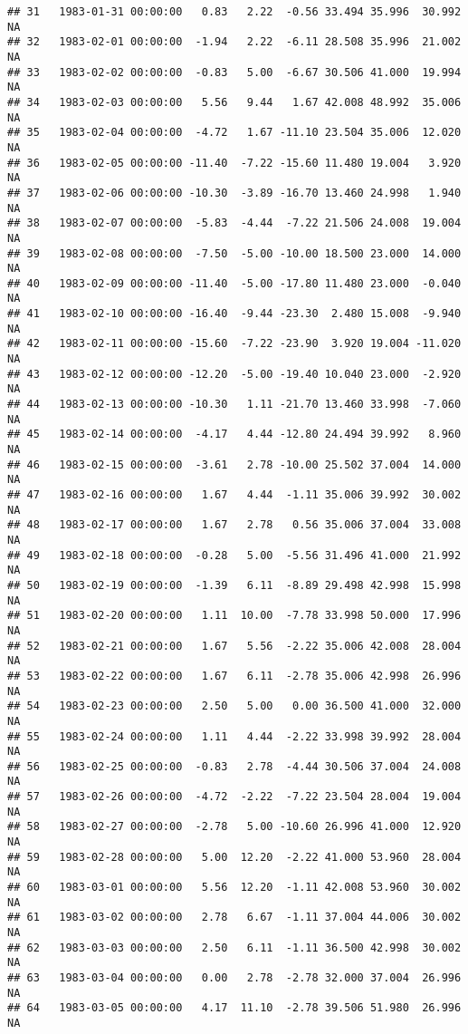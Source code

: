 \documentclass{article}\usepackage{graphicx, color}
\makeatletter
\newenvironment{kframe}{%
 \def\at@end@of@kframe{}%
 \ifinner\ifhmode%
  \def\at@end@of@kframe{\end{minipage}}%
  \begin{minipage}{\columnwidth}%
 \fi\fi%
 \def\FrameCommand##1{\hskip\@totalleftmargin \hskip-\fboxsep
 \colorbox{shadecolor}{##1}\hskip-\fboxsep
     \hskip-\linewidth \hskip-\@totalleftmargin \hskip\columnwidth}%
 \MakeFramed {\advance\hsize-\width
   \@totalleftmargin\z@ \linewidth\hsize
   \@setminipage}}%
 {\par\unskip\endMakeFramed%
 \at@end@of@kframe}
\newenvironment{knitrout}{}{} %
\makeatother
\begin{document}
\begin{knitrout}
\begin{kframe}
\begin{verbatim}
## 31   1983-01-31 00:00:00   0.83   2.22  -0.56 33.494 35.996  30.992     NA
## 32   1983-02-01 00:00:00  -1.94   2.22  -6.11 28.508 35.996  21.002     NA
## 33   1983-02-02 00:00:00  -0.83   5.00  -6.67 30.506 41.000  19.994     NA
## 34   1983-02-03 00:00:00   5.56   9.44   1.67 42.008 48.992  35.006     NA
## 35   1983-02-04 00:00:00  -4.72   1.67 -11.10 23.504 35.006  12.020     NA
## 36   1983-02-05 00:00:00 -11.40  -7.22 -15.60 11.480 19.004   3.920     NA
## 37   1983-02-06 00:00:00 -10.30  -3.89 -16.70 13.460 24.998   1.940     NA
## 38   1983-02-07 00:00:00  -5.83  -4.44  -7.22 21.506 24.008  19.004     NA
## 39   1983-02-08 00:00:00  -7.50  -5.00 -10.00 18.500 23.000  14.000     NA
## 40   1983-02-09 00:00:00 -11.40  -5.00 -17.80 11.480 23.000  -0.040     NA
## 41   1983-02-10 00:00:00 -16.40  -9.44 -23.30  2.480 15.008  -9.940     NA
## 42   1983-02-11 00:00:00 -15.60  -7.22 -23.90  3.920 19.004 -11.020     NA
## 43   1983-02-12 00:00:00 -12.20  -5.00 -19.40 10.040 23.000  -2.920     NA
## 44   1983-02-13 00:00:00 -10.30   1.11 -21.70 13.460 33.998  -7.060     NA
## 45   1983-02-14 00:00:00  -4.17   4.44 -12.80 24.494 39.992   8.960     NA
## 46   1983-02-15 00:00:00  -3.61   2.78 -10.00 25.502 37.004  14.000     NA
## 47   1983-02-16 00:00:00   1.67   4.44  -1.11 35.006 39.992  30.002     NA
## 48   1983-02-17 00:00:00   1.67   2.78   0.56 35.006 37.004  33.008     NA
## 49   1983-02-18 00:00:00  -0.28   5.00  -5.56 31.496 41.000  21.992     NA
## 50   1983-02-19 00:00:00  -1.39   6.11  -8.89 29.498 42.998  15.998     NA
## 51   1983-02-20 00:00:00   1.11  10.00  -7.78 33.998 50.000  17.996     NA
## 52   1983-02-21 00:00:00   1.67   5.56  -2.22 35.006 42.008  28.004     NA
## 53   1983-02-22 00:00:00   1.67   6.11  -2.78 35.006 42.998  26.996     NA
## 54   1983-02-23 00:00:00   2.50   5.00   0.00 36.500 41.000  32.000     NA
## 55   1983-02-24 00:00:00   1.11   4.44  -2.22 33.998 39.992  28.004     NA
## 56   1983-02-25 00:00:00  -0.83   2.78  -4.44 30.506 37.004  24.008     NA
## 57   1983-02-26 00:00:00  -4.72  -2.22  -7.22 23.504 28.004  19.004     NA
## 58   1983-02-27 00:00:00  -2.78   5.00 -10.60 26.996 41.000  12.920     NA
## 59   1983-02-28 00:00:00   5.00  12.20  -2.22 41.000 53.960  28.004     NA
## 60   1983-03-01 00:00:00   5.56  12.20  -1.11 42.008 53.960  30.002     NA
## 61   1983-03-02 00:00:00   2.78   6.67  -1.11 37.004 44.006  30.002     NA
## 62   1983-03-03 00:00:00   2.50   6.11  -1.11 36.500 42.998  30.002     NA
## 63   1983-03-04 00:00:00   0.00   2.78  -2.78 32.000 37.004  26.996     NA
## 64   1983-03-05 00:00:00   4.17  11.10  -2.78 39.506 51.980  26.996     NA

\end{verbatim}
\end{kframe}
\end{knitrout}
\end{document}
